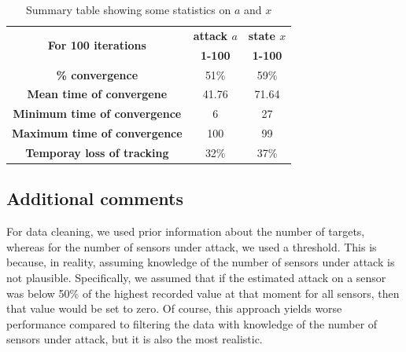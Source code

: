 \begin{table}[h!]
\centering
\begin{tabular}{|c|c|c|}
\hline
\multirow{2}{*}{\textbf{For 100 iterations}} & \multicolumn{1}{|c|}{\textbf{attack $a$}} & \multicolumn{1}{|c|}{\textbf{state $x$}} \\
\cline{2-3}
 & \textbf{1-100} & \textbf{1-100}\\
\hline
\textbf{\% convergence} &51\% &59\%  \\
\hline
\textbf{Mean time of convergene} &41.76 &71.64 \\
\hline
\textbf{Minimum time of convergence} &6 &27  \\
\hline
\textbf{Maximum time of convergence} &100 &99 \\
\hline
\textbf{Temporay loss of tracking} &32\% &37\%  \\
\hline
\end{tabular}
\caption{Summary table showing some statistics on $a$ and $x$}
\label{table:6}
\end{table}


    
    \subsection*{Additional comments}
    For data cleaning, we used prior information about the number of targets, whereas for the number of sensors under attack, we used a threshold. This is because, in reality, assuming knowledge of the number of sensors under attack is not plausible. Specifically, we assumed that if the estimated attack on a sensor was below 50\% of the highest recorded value at that moment for all sensors, then that value would be set to zero. Of course, this approach yields worse performance compared to filtering the data with knowledge of the number of sensors under attack, but it is also the most realistic.
